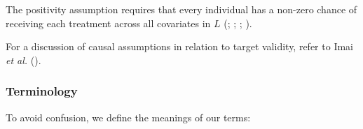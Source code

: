 \documentclass[
  single column]{article}
\begin{document}
The positivity assumption requires that every individual has a non-zero
chance of receiving each treatment across all covariates in \(L\)
(;
;
;
).

For a discussion of causal assumptions in relation to target validity,
refer to Imai \emph{et al.}
().

\subsubsection{Terminology}\label{terminology}

To avoid confusion, we define the meanings of our terms:
\end{document}
